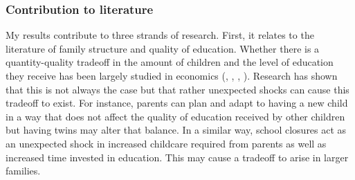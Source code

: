 

\subsubsection{Contribution to literature}

My results contribute to three strands of research. First, it relates to the literature of family structure and quality of education. Whether there is a quantity-quality tradeoff in the amount of children and the level of education they receive has been largely studied in economics (\cite{becker_child_1976}, \cite{black_more_2005}, \cite{black_small_2010}, \cite{angrist_multiple_2010}). Research has shown that this is not always the case but that rather unexpected shocks can cause this tradeoff to exist. For instance, parents can plan and adapt to having a new child in a way that does not affect the quality of education received by other children but having twins may alter that balance. In a similar way, school closures act as an unexpected shock in increased childcare required from parents as well as increased time invested in education. This may cause a tradeoff to arise in larger families.

